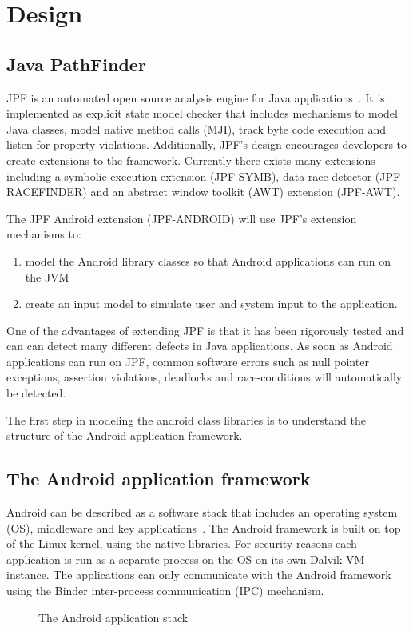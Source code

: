 \documentclass{acm_proc_article-sp}
\begin{document}
\section{Design}
\subsection{Java PathFinder}
JPF is an automated open source analysis engine for Java applications~\cite{JPFDocs}. It is implemented as explicit state model checker
that includes mechanisms to model Java classes, model native method calls (MJI), track byte code execution and listen for
property violations. Additionally, JPF's design encourages developers to create extensions to the framework. Currently there exists many
extensions including a symbolic execution extension (JPF-SYMB), data race
detector (JPF-RACEFINDER) and an abstract window toolkit (AWT) extension (JPF-AWT).

The JPF Android extension (JPF-ANDROID) will use JPF's extension mechanisms to:
\begin{enumerate}
\item model the Android library classes so that Android applications can run on the JVM
\item create an input model to simulate user and system input to the application.
\end{enumerate}

One of the advantages of extending JPF is that it has been rigorously tested and can can detect many different defects in Java applications. As soon as
Android applications can run on JPF, common software errors such as null pointer exceptions, assertion violations, deadlocks and
race-conditions will automatically be detected.

The first step in modeling the android class libraries is to understand the structure of the Android application framework.

\subsection{The Android application framework}

Android can be described as a software stack that includes an operating system (OS), middleware and key applications~\cite{AndroidDocs}. 
The Android framework is built on top of the Linux kernel, using the native libraries. For security reasons each application is run as a separate process on the OS on its 
own Dalvik VM instance. The applications can only communicate with the Android framework using the Binder inter-process communication (IPC) mechanism. 
\begin{figure}
\centering
{}
\caption{The Android application stack}
\end{figure}
\end{document}
